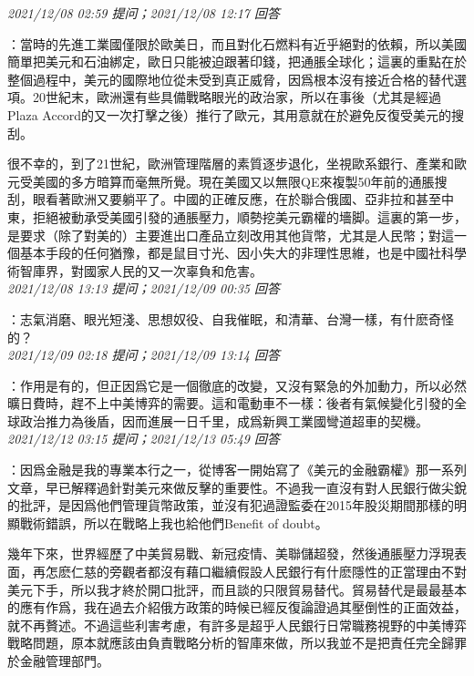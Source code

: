 \documentclass[twocolumn]{ctexart}
\begin{document}
\textit{\hfill\noindent\small 2021/12/08 02:59 提问；2021/12/08 12:17 回答}

：當時的先進工業國僅限於歐美日，而且對化石燃料有近乎絕對的依賴，所以美國簡單把美元和石油綁定，歐日只能被迫跟著印錢，把通脹全球化；這裏的重點在於整個過程中，美元的國際地位從未受到真正威脅，因爲根本沒有接近合格的替代選項。20世紀末，歐洲還有些具備戰略眼光的政治家，所以在事後（尤其是經過Plaza Accord的又一次打擊之後）推行了歐元，其用意就在於避免反復受美元的搜刮。

很不幸的，到了21世紀，歐洲管理階層的素質逐步退化，坐視歐系銀行、產業和歐元受美國的多方暗算而毫無所覺。現在美國又以無限QE來複製50年前的通脹搜刮，眼看著歐洲又要躺平了。中國的正確反應，在於聯合俄國、亞非拉和甚至中東，拒絕被動承受美國引發的通脹壓力，順勢挖美元霸權的墻脚。這裏的第一步，是要求（除了對美的）主要進出口產品立刻改用其他貨幣，尤其是人民幣；對這一個基本手段的任何猶豫，都是鼠目寸光、因小失大的非理性思維，也是中國社科學術智庫界，對國家人民的又一次辜負和危害。
\\

\textit{\hfill\noindent\small 2021/12/08 13:13 提问；2021/12/09 00:35 回答}

：志氣消磨、眼光短淺、思想奴役、自我催眠，和清華、台灣一樣，有什麽奇怪的？
\\

\textit{\hfill\noindent\small 2021/12/09 02:18 提问；2021/12/09 13:14 回答}

：作用是有的，但正因爲它是一個徹底的改變，又沒有緊急的外加動力，所以必然曠日費時，趕不上中美博弈的需要。這和電動車不一樣：後者有氣候變化引發的全球政治推力為後盾，因而進展一日千里，成爲新興工業國彎道超車的契機。
\\

\textit{\hfill\noindent\small 2021/12/12 03:15 提问；2021/12/13 05:49 回答}

：因爲金融是我的專業本行之一，從博客一開始寫了《美元的金融霸權》那一系列文章，早已解釋過針對美元來做反擊的重要性。不過我一直沒有對人民銀行做尖銳的批評，是因爲他們管理貨幣政策，並沒有犯過證監委在2015年股災期間那樣的明顯戰術錯誤，所以在戰略上我也給他們Benefit of doubt。

幾年下來，世界經歷了中美貿易戰、新冠疫情、美聯儲超發，然後通脹壓力浮現表面，再怎麽仁慈的旁觀者都沒有藉口繼續假設人民銀行有什麽隱性的正當理由不對美元下手，所以我才終於開口批評，而且談的只限貿易替代。貿易替代是最最基本的應有作爲，我在過去介紹俄方政策的時候已經反復論證過其壓倒性的正面效益，就不再贅述。不過這些利害考慮，有許多是超乎人民銀行日常職務視野的中美博弈戰略問題，原本就應該由負責戰略分析的智庫來做，所以我並不是把責任完全歸罪於金融管理部門。
\\
\end{document}
